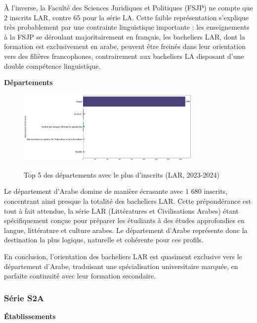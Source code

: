 À l’inverse, la Faculté des Sciences Juridiques et Politiques (FSJP) ne compte que 2 inscrits LAR, contre 65 pour la série LA. 
Cette faible représentation s’explique très probablement par une contrainte linguistique importante : 
les enseignements à la FSJP se déroulant majoritairement en français, les bacheliers LAR, dont la formation est exclusivement en arabe, peuvent être freinés dans leur orientation vers des filières francophones, contrairement aux bacheliers LA disposant d’une double compétence linguistique.

\textbf{Départements}

\begin{figure}[ht]
\centering
\caption{Top 5 des départements avec le plus d'inscrits (LAR, 2023-2024)}
\includegraphics[width=0.8\textwidth]{figure/dep_LAR_2024.png}
\label{fig:dep_lar_2024}
\end{figure}


Le département d’Arabe domine de manière écrasante avec 1 680 inscrits, concentrant ainsi presque la totalité des bacheliers LAR. 
Cette prépondérance est tout à fait attendue, la série LAR (Littératures et Civilisations Arabes) étant spécifiquement conçue pour préparer les étudiants à des études approfondies en langue, littérature et culture arabes. 
Le département d’Arabe représente donc la destination la plus logique, naturelle et cohérente pour ces profils.

En conclusion, l’orientation des bacheliers LAR est quasiment exclusive vers le département d’Arabe, traduisant une spécialisation universitaire marquée, en parfaite continuité avec leur formation secondaire.

\subsubsection{Série S2A}

\textbf{Établissements}

